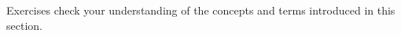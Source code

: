 {\noindent Exercises}
{ check your understanding of the concepts and terms introduced in this section.}
